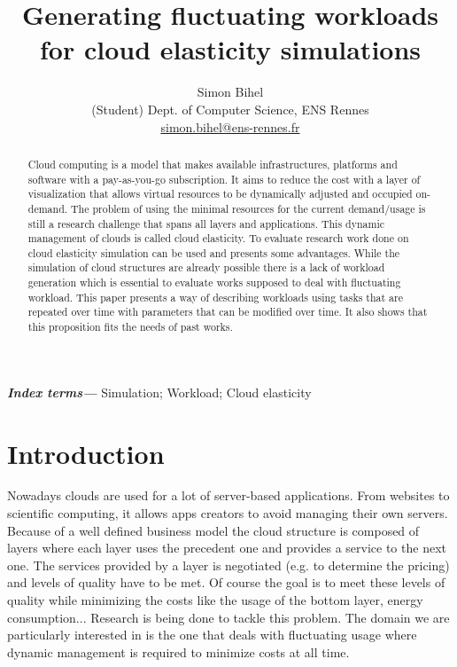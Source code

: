 \documentclass[a4paper, onecolumn, 11pt]{article}
\title{Generating fluctuating workloads for cloud elasticity simulations}
\author{Simon Bihel \\ (Student) Dept. of Computer Science, ENS Rennes\\
  \href{mailto:simon.bihel@ens-rennes.fr}{simon.bihel@ens-rennes.fr}}
\begin{document}
\maketitle

\begin{abstract}
  Cloud computing is a model that makes available infrastructures, platforms and
  software with a pay-as-you-go subscription. It aims to reduce the cost with a
  layer of visualization that allows virtual resources to be dynamically
  adjusted and occupied on-demand. The problem of using the minimal resources
  for the current demand/usage is still a research challenge that spans all
  layers and applications. This dynamic management of clouds is called cloud
  elasticity. To evaluate research work done on cloud elasticity simulation can 
  be used and presents some advantages. While the simulation of cloud 
  structures are already possible there is a lack of workload generation which 
  is essential to evaluate works supposed to deal with fluctuating workload. 
  This paper presents a way of describing workloads using tasks that are 
  repeated over time with parameters that can be modified over time. It also 
  shows that this proposition fits the needs of past works.
\end{abstract}

\providecommand{\keywords}[1]{\textbf{\textit{Index terms---}} #1}
\keywords{Simulation; Workload; Cloud elasticity}

\section{Introduction} \label{intro}
  Nowadays clouds are used for a lot of server-based applications. From websites
  to scientific computing, it allows apps creators to avoid managing their own
  servers. Because of a well defined business model the cloud structure is
  composed of layers where each layer uses the precedent one and provides a
  service to the next one. The services provided by a layer is negotiated (e.g.
  to determine the pricing) and levels of quality have to be met. Of course the
  goal is to meet these levels of quality while minimizing the costs like the
  usage of the bottom layer, energy consumption... Research is being done to
  tackle this problem. The domain we are particularly interested in is the one
  that deals with fluctuating usage where dynamic management is required to
  minimize costs at all time.
  
\end{document}
